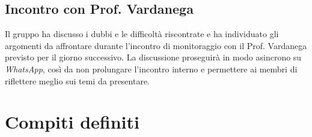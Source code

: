 \documentclass[12pt, a4paper]{article}
\begin{document}
\subsection{Incontro con Prof. Vardanega}
Il gruppo ha discusso i dubbi e le difficoltà riscontrate e ha individuato gli argomenti da affrontare durante l'incontro di monitoraggio con il Prof. Vardanega previsto per il giorno successivo. La discussione proseguirà in modo asincrono su \textit{WhatsApp}, così da non prolungare l'incontro interno e permettere ai membri di riflettere meglio sui temi da presentare.

\newpage
\section{Compiti definiti} 
\end{document}
